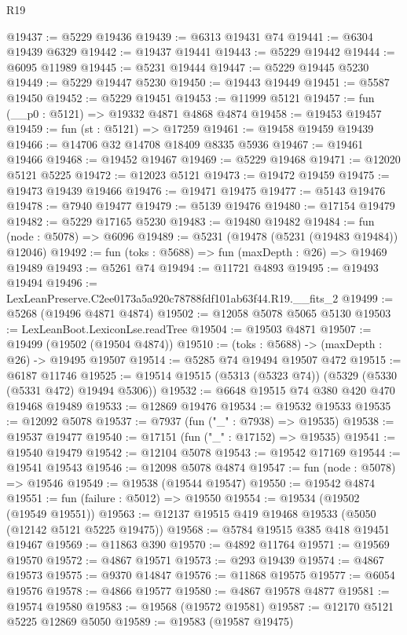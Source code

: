 \begin{lexlean}{R19}
\begin{coremodule}
@19437 := @5229 @19436
@19439 := @6313 @19431 @74
@19441 := @6304 @19439 @6329
@19442 := @19437 @19441
@19443 := @5229 @19442
@19444 := @6095 @11989
@19445 := @5231 @19444
@19447 := @5229 @19445 @5230
@19449 := @5229 @19447 @5230
@19450 := @19443 @19449
@19451 := @5587 @19450
@19452 := @5229 @19451
@19453 := @11999 @5121
@19457 := fun (__p0 : @5121) => @19332 @4871 @4868 @4874
@19458 := @19453 @19457
@19459 := fun (st : @5121) => @17259
@19461 := @19458 @19459 @19439
@19466 := @14706 @32 @14708 @18409 @8335 @5936
@19467 := @19461 @19466
@19468 := @19452 @19467
@19469 := @5229 @19468
@19471 := @12020 @5121 @5225
@19472 := @12023 @5121
@19473 := @19472 @19459
@19475 := @19473 @19439 @19466
@19476 := @19471 @19475
@19477 := @5143 @19476
@19478 := @7940 @19477
@19479 := @5139 @19476
@19480 := @17154 @19479
@19482 := @5229 @17165 @5230
@19483 := @19480 @19482
@19484 := fun (node : @5078) => @6096
@19489 := @5231 (@19478 (@5231 (@19483 @19484)) @12046)
@19492 := fun (toks : @5688) => fun (maxDepth : @26) => @19469 @19489
@19493 := @5261 @74
@19494 := @11721 @4893
@19495 := @19493 @19494
@19496 := LexLeanPreserve.C2ee0173a5a920c78788fdf101ab63f44.R19.__fits_2
@19499 := @5268 (@19496 @4871 @4874)
@19502 := @12058 @5078 @5065 @5130
@19503 := LexLeanBoot.LexiconLse.readTree
@19504 := @19503 @4871
@19507 := @19499 (@19502 (@19504 @4874))
@19510 := (toks : @5688) -> (maxDepth : @26) -> @19495 @19507
@19514 := @5285 @74 @19494 @19507 @472
@19515 := @6187 @11746
@19525 := @19514 @19515 (@5313 (@5323 @74)) (@5329 (@5330 (@5331 @472) @19494 @5306))
@19532 := @6648 @19515 @74 @380 @420 @470 @19468 @19489
@19533 := @12869 @19476
@19534 := @19532 @19533
@19535 := @12092 @5078
@19537 := @7937 (fun ("_" : @7938) => @19535)
@19538 := @19537 @19477
@19540 := @17151 (fun ("_" : @17152) => @19535)
@19541 := @19540 @19479
@19542 := @12104 @5078
@19543 := @19542 @17169
@19544 := @19541 @19543
@19546 := @12098 @5078 @4874
@19547 := fun (node : @5078) => @19546
@19549 := @19538 (@19544 @19547)
@19550 := @19542 @4874
@19551 := fun (failure : @5012) => @19550
@19554 := @19534 (@19502 (@19549 @19551))
@19563 := @12137 @19515 @419 @19468 @19533 (@5050 (@12142 @5121 @5225 @19475))
@19568 := @5784 @19515 @385 @418 @19451 @19467
@19569 := @11863 @390
@19570 := @4892 @11764
@19571 := @19569 @19570
@19572 := @4867 @19571
@19573 := @293 @19439
@19574 := @4867 @19573
@19575 := @9370 @14847
@19576 := @11868 @19575
@19577 := @6054 @19576
@19578 := @4866 @19577
@19580 := @4867 @19578 @4877
@19581 := @19574 @19580
@19583 := @19568 (@19572 @19581)
@19587 := @12170 @5121 @5225 @12869 @5050
@19589 := @19583 (@19587 @19475)

\end{coremodule}
\end{lexlean}
